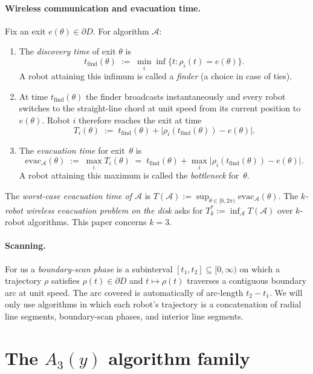\documentclass[11pt]{article}
\theoremstyle{plain}
\theoremstyle{definition}
\theoremstyle{remark}
\begin{document}
\paragraph{Wireless communication and evacuation time.} Fix an exit
$e(\theta) \in \partial D$. For algorithm $\mathcal A$:
\begin{enumerate}
\item[(a)] The \emph{discovery time} of exit $\theta$ is
\[
t_{\mathrm{find}}(\theta) \;:=\; \min_i \inf\{t : \rho_i(t) = e(\theta)\}.
\]
A robot attaining this infimum is called a \emph{finder} (a choice in
case of ties).
\item[(b)] At time $t_{\mathrm{find}}(\theta)$ the finder broadcasts
instantaneously and every robot switches to the straight-line chord at
unit speed from its current position to $e(\theta)$. Robot $i$ therefore
reaches the exit at time
\[
T_i(\theta) \;:=\; t_{\mathrm{find}}(\theta)
+ \bigl\lvert \rho_i(t_{\mathrm{find}}(\theta)) - e(\theta) \bigr\rvert.
\]
\item[(c)] The \emph{evacuation time} for exit~$\theta$ is
\begin{equation}
\label{eq:evac}
\mathrm{evac}_{\mathcal A}(\theta) \;:=\; \max_i T_i(\theta)
\;=\; t_{\mathrm{find}}(\theta)
+ \max_i \bigl\lvert \rho_i(t_{\mathrm{find}}(\theta)) - e(\theta) \bigr\rvert.
\end{equation}
A robot attaining this maximum is called the \emph{bottleneck} for~$\theta$.
\end{enumerate}
The \emph{worst-case evacuation time of $\mathcal A$} is
$T(\mathcal A) := \sup_{\theta \in [0, 2\pi)} \mathrm{evac}_{\mathcal A}(\theta)$.
The \emph{$k$-robot wireless evacuation problem on the disk} asks for
$T^*_k := \inf_{\mathcal A} T(\mathcal A)$ over $k$-robot algorithms.
This paper concerns $k = 3$.

\paragraph{Scanning.} For us a \emph{boundary-scan phase} is a
subinterval $[t_1, t_2] \subseteq [0, \infty)$ on which a trajectory
$\rho$ satisfies $\rho(t) \in \partial D$ and $t \mapsto
\rho(t)$ traverses a contiguous boundary arc at unit speed. The arc
covered is automatically of arc-length $t_2 - t_1$. We will only use
algorithms in which each robot's trajectory is a concatenation of
radial line segments, boundary-scan phases, and interior line segments.

\section{The $A_3(y)$ algorithm family}
\label{sec:background}
\end{document}
